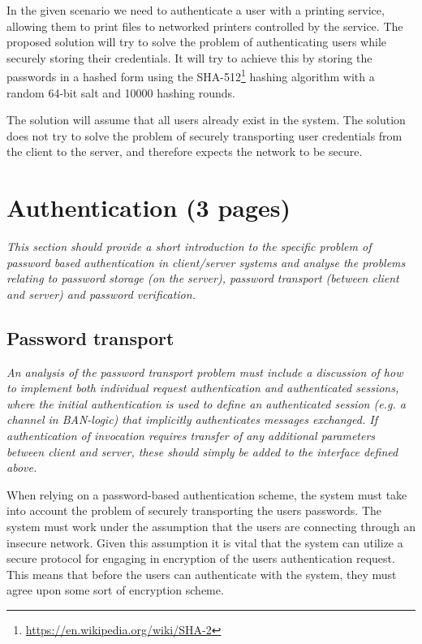 \documentclass[12pt]{article}
\begin{document}
In the given scenario we need to authenticate a user with a printing service, allowing them to print files to networked printers controlled by the service. The proposed solution will try to solve the problem of authenticating users while securely storing their credentials. It will try to achieve this by storing the passwords in a hashed form using the SHA-512\footnote{\url{https://en.wikipedia.org/wiki/SHA-2}} hashing algorithm with a random 64-bit salt and 10000 hashing rounds.

The solution will assume that all users already exist in the system.
The solution does not try to solve the problem of securely transporting user credentials from the client to the server, and therefore expects the network to be secure.

\newpage

\section{Authentication (3 pages)}
\label{sec:Authentication}

\textit{This section should provide a short introduction to the specific problem of password based authentication in client/server systems and analyse the problems relating to password storage (on the server), password transport (between client and server) and password verification.}

\subsection{Password transport}
\label{sub:Password transport}

\textit{An analysis of the password transport problem must include a discussion of how to implement both individual request authentication and authenticated sessions, where the initial authentication is used to define an authenticated session (e.g. a channel in BAN-logic) that implicitly authenticates messages exchanged. If authentication of invocation requires transfer of any additional parameters between client and server, these should simply be added to the interface defined above.}

When relying on a password-based authentication scheme, the system must take into account the problem of securely transporting the users passwords. The system must work under the assumption that the users are connecting through an insecure network. Given this assumption it is vital that the system can utilize a secure protocol for engaging in encryption of the users authentication request. This means that before the users can authenticate with the system, they must agree upon some sort of encryption scheme.
\end{document}
